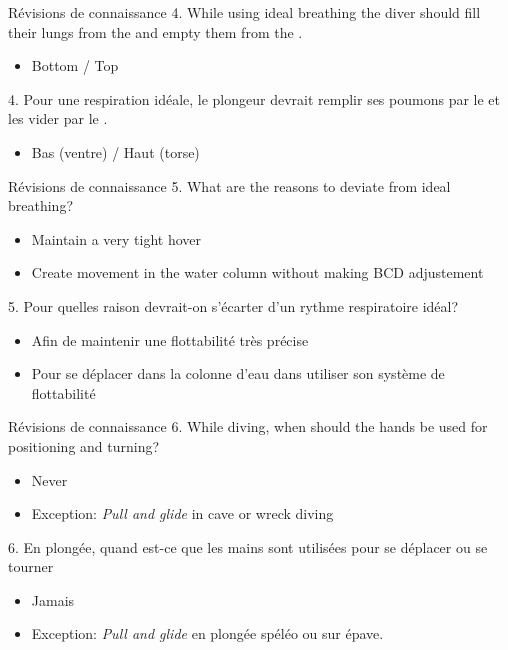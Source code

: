 \begin{frame}{Révisions de connaissance}  
	4. While using ideal breathing the diver should fill their lungs from the \underline{\hspace{1cm}} and empty them from the \underline{\hspace{1cm}}.
	\begin{itemize}
		\item Bottom / Top
	\end{itemize}

	\vfill

	4. Pour une respiration idéale, le plongeur devrait remplir ses poumons par le \underline{\hspace{1cm}} et les vider par le \underline{\hspace{1cm}}.
	\begin{itemize}
		\item Bas (ventre) / Haut (torse)
	\end{itemize}
\end{frame}

\begin{frame}{Révisions de connaissance}  
	5. What are the reasons to deviate from ideal breathing?
	\begin{itemize}
		\item Maintain a very tight hover
		\item Create movement in the water column without making BCD adjustement
	\end{itemize}

	\vfill

	5. Pour quelles raison devrait-on s'écarter d'un rythme respiratoire idéal?
	\begin{itemize}
		\item Afin de maintenir une flottabilité très précise
		\item Pour se déplacer dans la colonne d'eau dans utiliser son système de flottabilité
	\end{itemize}
\end{frame}

\begin{frame}{Révisions de connaissance}  
	6. While diving, when should the hands be used for positioning and turning?
	\begin{itemize}
		\item Never
		\item Exception: \textit{Pull and glide} in cave or wreck diving
	\end{itemize}

	\vfill
	
	6. En plongée, quand est-ce que les mains sont utilisées pour se déplacer ou se tourner
	\begin{itemize}
		\item Jamais
		\item Exception: \textit{Pull and glide} en plongée spéléo ou sur épave.
	\end{itemize}
\end{frame}

